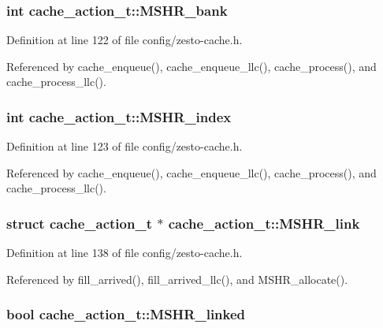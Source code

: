 \subsubsection[{MSHR\_\-bank}]{\setlength{\rightskip}{0pt plus 5cm}int {\bf cache\_\-action\_\-t::MSHR\_\-bank}}\label{structcache__action__t_8e3e1e7ddd0034cf7113513fa37d2bb6}




Definition at line 122 of file config/zesto-cache.h.

Referenced by cache\_\-enqueue(), cache\_\-enqueue\_\-llc(), cache\_\-process(), and cache\_\-process\_\-llc().
\subsubsection[{MSHR\_\-index}]{\setlength{\rightskip}{0pt plus 5cm}int {\bf cache\_\-action\_\-t::MSHR\_\-index}}\label{structcache__action__t_91d183792805eec322933592ee88e011}




Definition at line 123 of file config/zesto-cache.h.

Referenced by cache\_\-enqueue(), cache\_\-enqueue\_\-llc(), cache\_\-process(), and cache\_\-process\_\-llc().
\subsubsection[{MSHR\_\-link}]{\setlength{\rightskip}{0pt plus 5cm}struct {\bf cache\_\-action\_\-t} $\ast$ {\bf cache\_\-action\_\-t::MSHR\_\-link}\hspace{0.3cm}{\tt  [read]}}\label{structcache__action__t_e23f26f061d85665b211c3a8d3f417b9}




Definition at line 138 of file config/zesto-cache.h.

Referenced by fill\_\-arrived(), fill\_\-arrived\_\-llc(), and MSHR\_\-allocate().
\subsubsection[{MSHR\_\-linked}]{\setlength{\rightskip}{0pt plus 5cm}bool {\bf cache\_\-action\_\-t::MSHR\_\-linked}}\label{structcache__action__t_7f2eb43215f9921b36918539bdcf062f}




